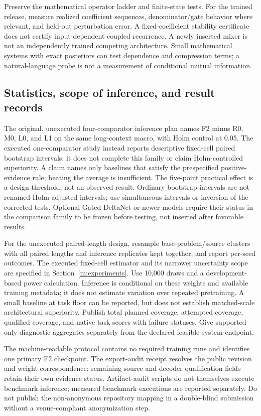 \documentclass{article}
\theoremstyle{remark}\newtheorem{remark}[theorem]{Remark}
\begin{document}
Preserve the mathematical operator ladder and finite-state tests. For the trained release, measure realized coefficient sequences, denominator/gate behavior where relevant, and held-out perturbation error. A fixed-coefficient stability certificate does not certify input-dependent coupled recurrence. A newly inserted mixer is not an independently trained competing architecture. Small mathematical systems with exact posteriors can test dependence and compression terms; a natural-language probe is not a measurement of conditional mutual information.

\subsection{Statistics, scope of inference, and result records}
The original, unexecuted four-comparator inference plan names F2 minus R0, M0, L0, and L1 on the same long-context macro, with Holm control at 0.05. The executed one-comparator study instead reports descriptive fixed-cell paired bootstrap intervals; it does not complete this family or claim Holm-controlled superiority. A claim names only baselines that satisfy the prespecified positive-evidence rule; beating the average is insufficient. The five-point practical effect is a design threshold, not an observed result. Ordinary bootstrap intervals are not renamed Holm-adjusted intervals; use simultaneous intervals or inversion of the corrected tests. Optional Gated DeltaNet or newer models require their status in the comparison family to be frozen before testing, not inserted after favorable results.

For the unexecuted paired-length design, resample base-problem/source clusters with all paired lengths and inference replicates kept together, and report per-seed outcomes. The executed fixed-cell estimator and its narrower uncertainty scope are specified in Section~\ref{m:experiments}. Use 10,000 draws and a development-based power calculation. Inference is conditional on these weights and available training metadata; it does not estimate variation over repeated pretraining. A small baseline at task floor can be reported, but does not establish matched-scale architectural superiority. Publish total planned coverage, attempted coverage, qualified coverage, and native task scores with failure statuses. Give supported-only diagnostic aggregates separately from the declared feasible-system endpoint.

The machine-readable protocol contains no required training runs and identifies one primary F2 checkpoint. The export-audit receipt resolves the public revision and weight correspondence; remaining source and decoder qualification fields retain their own evidence status. Artifact-audit scripts do not themselves execute benchmark inference; measured benchmark executions are reported separately. Do not publish the non-anonymous repository mapping in a double-blind submission without a venue-compliant anonymization step.
\end{document}
